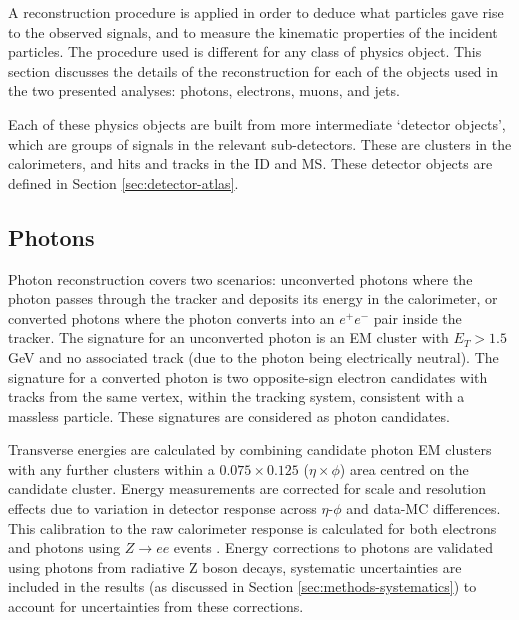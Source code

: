 
A reconstruction procedure is applied in order to
deduce what particles gave rise to the observed signals,
and to measure the
kinematic properties of the incident particles.
The procedure used is different for any class of physics object. This section
discusses the details of the reconstruction for each of the objects used in the
two presented analyses: photons, electrons, muons, and jets.

Each of these physics objects are built from more intermediate `detector
objects', which are groups of signals in the relevant sub-detectors. These are
clusters in the calorimeters, and hits and tracks in the
\ac{ID} and \ac{MS}. These detector objects are defined in Section
\ref{sec:detector-atlas}.

\subsection{Photons}
\label{sec:methods-reconsruction-photon}

Photon reconstruction covers two scenarios: unconverted photons where the photon
passes through the tracker and deposits its energy in the calorimeter, or
converted photons where the photon converts into an $e^+e^-$ pair inside the
tracker.
The signature for an unconverted photon is an \ac{EM} cluster with $E_T > 1.5$
GeV and no associated
track (due to the photon being electrically neutral). The signature for a
converted photon is two opposite-sign electron candidates with tracks from the
same vertex, within the tracking system, consistent with a massless particle.
These signatures are considered as photon candidates.

Transverse energies are calculated by combining candidate photon \ac{EM}
clusters with any further clusters within a $0.075\times0.125$
($\eta\times\phi$) area centred on the candidate cluster. Energy measurements
are corrected for scale and resolution effects due to variation in detector
response across $\eta$-$\phi$ and data-\ac{MC} differences. This calibration to
the raw calorimeter response is
calculated for both electrons and photons using $Z\to ee$ events
\cite{EGamCalibration2019}. Energy corrections to photons are validated using
photons from radiative Z boson decays, systematic uncertainties are included in
the results
(as discussed in Section \ref{sec:methods-systematics}) to account for
uncertainties from these corrections.

